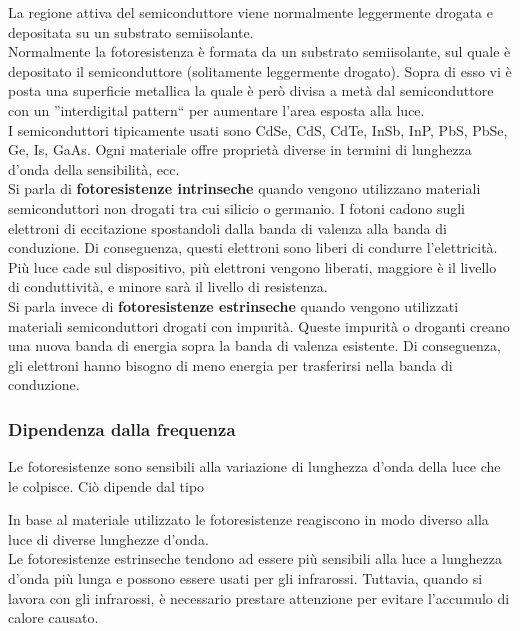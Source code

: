\documentclass[12pt,oneside,a4paper]{article}
\begin{document}
La regione attiva del semiconduttore viene normalmente leggermente drogata e depositata su un substrato semiisolante.
\\Normalmente la fotoresistenza è formata da un substrato semiisolante, sul quale è depositato il semiconduttore (solitamente leggermente drogato). Sopra di esso vi è posta una superficie metallica la quale è però divisa a metà dal semiconduttore con un ''interdigital pattern`` per aumentare l'area esposta alla luce.
\\I semiconduttori tipicamente usati sono CdSe, CdS, CdTe, InSb, InP, PbS, PbSe, Ge, Is, GaAs. Ogni materiale offre proprietà diverse in termini di lunghezza d'onda della sensibilità, ecc.
\\Si parla di \textbf{fotoresistenze intrinseche} quando vengono utilizzano materiali semiconduttori non drogati tra cui silicio o germanio. I fotoni cadono sugli elettroni di eccitazione spostandoli dalla banda di valenza alla banda di conduzione. Di conseguenza, questi elettroni sono liberi di condurre l'elettricità.
\\Più luce cade sul dispositivo, più elettroni vengono liberati, maggiore è il livello di conduttività, e minore sarà il livello di resistenza.
\\Si parla invece di \textbf{fotoresistenze estrinseche} quando vengono utilizzati materiali semiconduttori drogati con impurità. Queste impurità o droganti creano una nuova banda di energia sopra la banda di valenza esistente. Di conseguenza, gli elettroni hanno bisogno di meno energia per trasferirsi nella banda di conduzione.


\subsubsection{Dipendenza dalla frequenza}
Le fotoresistenze sono sensibili alla variazione di lunghezza d'onda della luce che le colpisce. Ciò dipende dal tipo 

In base al materiale utilizzato le fotoresistenze reagiscono in modo diverso alla luce di diverse lunghezze d'onda.
\\Le fotoresistenze estrinseche tendono ad essere più sensibili alla luce a lunghezza d'onda più lunga e possono essere usati per gli infrarossi. Tuttavia, quando si lavora con gli infrarossi, è necessario prestare attenzione per evitare l'accumulo di calore causato.
\end{document}
